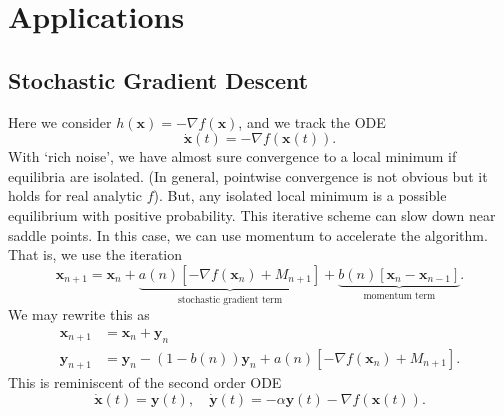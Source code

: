 \section{Applications}

\subsection{Stochastic Gradient Descent}

Here we consider $h(\mathbf{x}) = -\nabla f(\mathbf{x})$, and we track the ODE
\[
    \dot{\mathbf{x}}(t) = -\nabla f(\mathbf{x}(t)).
\]
With `rich noise', we have almost sure convergence to a local minimum if equilibria are isolated. (In general, pointwise convergence is not obvious but it holds for real analytic $f$). But, any isolated local minimum is a possible equilibrium with positive probability. This iterative scheme can slow down near saddle points. In this case, we can use momentum to accelerate the algorithm. That is, we use the iteration
\[
    \mathbf{x}_{n+1} = \mathbf{x}_n + \underbrace{a(n) \left[ -\nabla f(\mathbf{x}_n) + M_{n+1} \right]}_{\text{stochastic gradient term}} + \underbrace{b(n) \left[ \mathbf{x}_n - \mathbf{x}_{n-1} \right]}_{\text{momentum term}}.
\]
We may rewrite this as
\begin{align*}
    \mathbf{x}_{n+1} &= \mathbf{x}_n + \mathbf{y}_n \\
    \mathbf{y}_{n+1} &= \mathbf{y}_n - (1-b(n))\mathbf{y}_n + a(n) \left[ -\nabla f(\mathbf{x}_n) + M_{n+1} \right].
\end{align*}
This is reminiscent of the second order ODE
\[
    \dot{\mathbf{x}}(t) = \mathbf{y}(t), \quad \dot{\mathbf{y}}(t) = -\alpha \mathbf{y}(t) - \nabla f(\mathbf{x}(t)).
\]